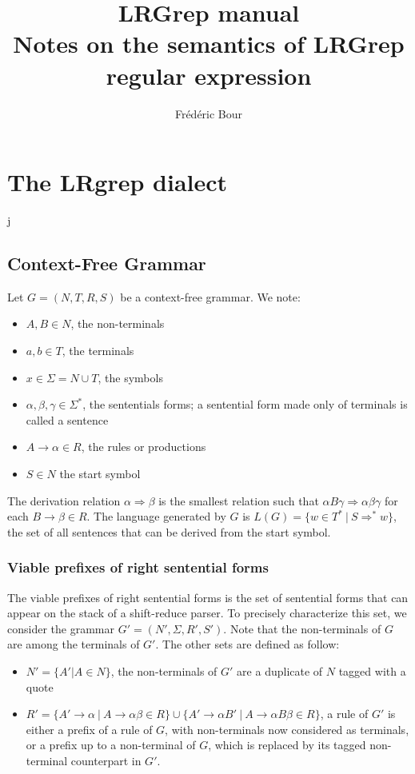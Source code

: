 \documentclass{article}
\title{LRGrep manual \\
  Notes on the semantics of LRGrep regular expression}
\author{Frédéric Bour}
\begin{document}
\maketitle

\section{The LRgrep dialect}

j\subsection{Context-Free Grammar}

Let $G = (N, T, R, S)$ be a context-free grammar. We note:
\begin{itemize}
  \item $A, B \in N$, the non-terminals
  \item $a, b \in T$, the terminals
  \item $x \in \Sigma = N \cup T$, the symbols
  \item $\alpha, \beta, \gamma \in \Sigma^*$, the sententials forms; a sentential form made only of terminals is called a sentence
  \item $A \rightarrow \alpha \in R$, the rules or productions
  \item $S \in N$ the start symbol
\end{itemize}

The derivation relation $\alpha\Rightarrow\beta$ is the smallest relation such that $\alpha B \gamma \Rightarrow \alpha\beta\gamma$ for each $B\rightarrow \beta \in R$.
The language generated by $G$ is $L(G) = \{w \in T^*\ |\ S \Rightarrow^* w\}$, the set of all sentences that can be derived  from the start symbol.

\subsubsection{Viable prefixes of right sentential forms}

The viable prefixes of right sentential forms is the set of sentential forms that can appear on the stack of a shift-reduce parser.
To precisely characterize this set, we consider the grammar $G' = (N', \Sigma, R', S')$. Note that the non-terminals of $G$ are among the terminals of $G'$. The other sets are defined as follow:
\begin{itemize}
  \item $N' = \{ A' | A \in N \}$, the non-terminals of $G'$ are a duplicate of $N$ tagged with a quote
  \item $R' = \{ A' \rightarrow \alpha\ |\ A \rightarrow \alpha\beta \in R\}
         \cup \{ A' \rightarrow \alpha B'\ |\ A \rightarrow \alpha B \beta \in R\}$, a rule of $G'$ is either a prefix of a rule of $G$, with non-terminals now considered as terminals, or a prefix up to a non-terminal of $G$, which is replaced by its tagged non-terminal counterpart in $G'$.
\end{itemize}
\end{document}
